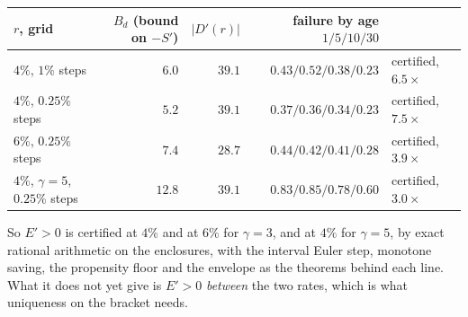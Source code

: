 \begin{center}
\begin{tabular}{lrrrl}
\toprule
$r$, grid & $B_d$ (bound on $-S'$) & $|D'(r)|$ & failure by age $1/5/10/30$ & \\
\midrule
$4\%$, $1\%$ steps & $6.0$ & $39.1$ & $0.43/0.52/0.38/0.23$ & certified, $6.5\times$\\
$4\%$, $0.25\%$ steps & $5.2$ & $39.1$ & $0.37/0.36/0.34/0.23$ & certified, $7.5\times$\\
$6\%$, $0.25\%$ steps & $7.4$ & $28.7$ & $0.44/0.42/0.41/0.28$ & certified, $3.9\times$\\
$4\%$, $\gamma=5$, $0.25\%$ steps & $12.8$ & $39.1$ & $0.83/0.85/0.78/0.60$ & certified, $3.0\times$\\
\bottomrule
\end{tabular}
\end{center}

So $E'>0$ is certified at $4\%$ and at $6\%$ for $\gamma=3$, and at $4\%$ for $\gamma=5$, by exact rational arithmetic on the
enclosures, with the interval Euler step, monotone saving, the propensity floor and the envelope as
the theorems behind each line. What it does not yet give is $E'>0$ \emph{between} the two rates,
which is what uniqueness on the bracket needs.

